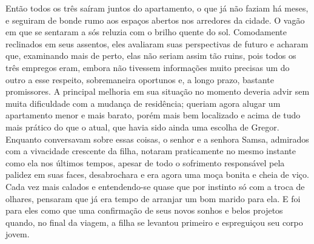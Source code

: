 Então todos os três saíram juntos do apartamento, o que já não faziam há
meses, e seguiram de bonde rumo aos espaços abertos nos arredores da
cidade. O vagão em que se sentaram a sós reluzia com o brilho quente do
sol. Comodamente reclinados em seus assentos, eles avaliaram suas
perspectivas de futuro e acharam que, examinando mais de perto, elas não
seriam assim tão ruins, pois todos os três empregos eram, embora não
tivessem informações muito precisas um do outro a esse respeito,
sobremaneira oportunos e, a longo prazo, bastante promissores. A principal
melhoria em sua situação no momento deveria advir sem muita dificuldade
com a mudança de residência; queriam agora alugar um apartamento menor e
mais barato, porém mais bem localizado e acima de tudo mais prático do que
o atual, que havia sido ainda uma escolha de Gregor. Enquanto conversavam
sobre essas coisas, o senhor e a senhora Samsa, admirados com a vivacidade
crescente da filha, notaram praticamente no mesmo instante como ela nos
últimos tempos, apesar de todo o sofrimento responsável pela palidez em
suas faces, desabrochara e era agora uma moça bonita e cheia de viço. Cada
vez mais calados e entendendo-se quase que por instinto só com a troca de
olhares, pensaram que já era tempo de arranjar um bom marido para ela. E
foi para eles como que uma confirmação de seus novos sonhos e belos
projetos quando, no final da viagem, a filha se levantou primeiro e
espreguiçou seu corpo jovem.

